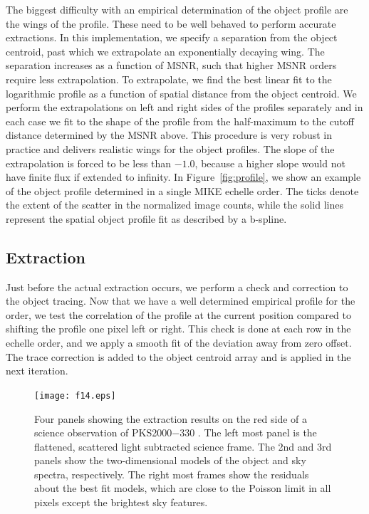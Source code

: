 \documentclass[]{emulateapj}
\begin{document}
The biggest difficulty with an empirical determination of the object profile 
are the wings of the profile.  These need to be well behaved to perform
accurate extractions.  In this implementation, we specify a separation from the
object centroid, past which we extrapolate an exponentially decaying wing.
The separation increases as a function of MSNR, such that higher MSNR orders
require less extrapolation.  To extrapolate, we find the best linear fit
to the logarithmic profile as a function of spatial distance 
from the object centroid.
We perform the extrapolations on left and right sides of the profiles 
separately and in each case we fit to the shape of the profile from the 
half-maximum to the cutoff distance determined by the MSNR above.
This procedure is very robust in practice and delivers realistic wings for
the object profiles.  The slope of the extrapolation is forced to be less
than $-1.0$, because a higher slope would not have finite flux if 
extended to infinity.  In Figure~\ref{fig:profile}, we show an example of the
object profile determined in a single MIKE echelle order.  The ticks denote the
extent of the scatter in the normalized image counts, while the solid lines
represent the spatial object profile fit as described by a b-spline.

\subsection{Extraction}

Just before the actual extraction occurs, we perform
a check and correction to the object tracing.
Now that we have a well determined empirical profile for the order, we test
the correlation of the profile at the current position compared to shifting
the profile one pixel left or right.  This check is done at each row in the
echelle order, and we apply a smooth fit of the
deviation away from zero offset.
The trace correction is added to the object centroid array and
is applied in the next iteration.


\begin{figure}
\texttt{[image: f14.eps]}
\caption{Four panels showing the extraction results on the red side of a
science observation of PKS2000$-$330 \citep[see][]{ppo+10}.  The left most panel
is the flattened, scattered light subtracted science frame.  The 2nd and 3rd
panels show the two-dimensional models of the object and sky spectra, 
respectively.  The right most frames show the residuals about the best fit 
models, which are close to the Poisson limit in all pixels except the brightest
sky features. }
\label{fig:extract}
\end{figure}
\end{document}
